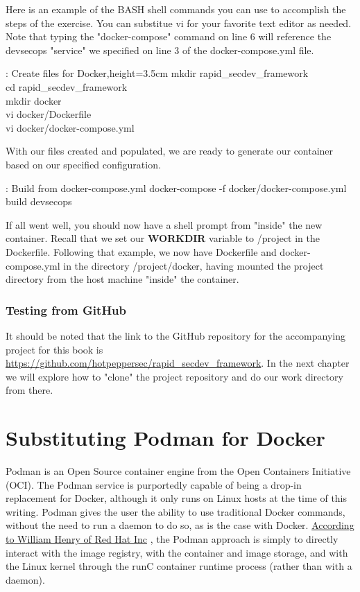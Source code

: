 \justify
Here is an example of the BASH shell commands you can use to accomplish
the steps of the exercise. You can substitue vi for your favorite text
editor as needed. Note that typing the "docker-compose" command on line
6 will reference the devsecops "service" we specified on line 3 of the
docker-compose.yml file.

\justify
\begin{mybox}{\thetcbcounter: Create files for Docker,height=3.5cm}
mkdir rapid\_secdev\_framework\\
cd rapid\_secdev\_framework\\
mkdir docker\\
vi docker/Dockerfile\\
vi docker/docker-compose.yml
\end{mybox}

\justify
With our files created and populated, we are ready to generate our
container based on our specified configuration.

\begin{mybox}{\thetcbcounter: Build from docker-compose.yml }
docker-compose -f docker/docker-compose.yml build devsecops
\end{mybox}

\justify
If all went well, you should now have a shell prompt from "inside" the
new container. Recall that we set our \textbf{WORKDIR} variable to /project in the Dockerfile. Following that example, we now have Dockerfile and docker-compose.yml in the directory /project/docker, having mounted the project directory from the host machine "inside" the container.

\subsubsection{Testing from GitHub}
\justify
It should be noted that the link to the GitHub repository for the accompanying project for this book is
\url{https://github.com/hotpeppersec/rapid_secdev_framework}. In the next chapter we will explore how to "clone" the project repository and do our work directory from there.

\section{Substituting Podman for Docker}
\justify
Podman is an Open Source container engine from the Open Containers Initiative (OCI). The Podman service is purportedly capable of being a drop-in replacement for Docker, although it only runs on Linux hosts at the time of this writing. Podman gives the user the ability to use traditional Docker commands, without the need to run a daemon to do so,
as is the case with Docker.
\href{https://developers.redhat.com/blog/2019/02/21/podman-and-buildah-for-docker-users/}{According to William Henry of Red Hat Inc} , the Podman approach is simply to directly interact with the image registry, with the container and image storage, and with the Linux kernel through the runC container runtime process (rather than with a daemon).

